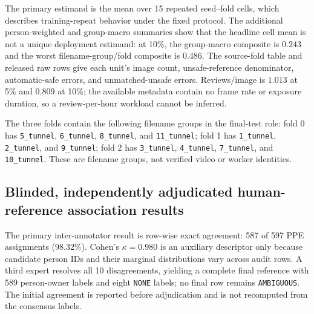 \documentclass[iicol,pdflatex,sn-mathphys-num]{sn-jnl}
\begin{document}
The primary estimand is the mean over 15 repeated seed--fold cells, which describes training-repeat behavior under the fixed protocol. The additional person-weighted and group-macro summaries show that the headline cell mean is not a unique deployment estimand: at 10\%, the group-macro composite is $0.243$ and the worst filename-group/fold composite is $0.486$. The source-fold table and released raw rows give each unit's image count, unsafe-reference denominator, automatic-safe errors, and unmatched-unsafe errors. Reviews/image is $1.013$ at 5\% and $0.809$ at 10\%; the available metadata contain no frame rate or exposure duration, so a review-per-hour workload cannot be inferred.

The three folds contain the following filename groups in the final-test role: fold 0 has \texttt{5\_tunnel}, \texttt{6\_tunnel}, \texttt{8\_tunnel}, and \texttt{11\_tunnel}; fold 1 has \texttt{1\_tunnel}, \texttt{2\_tunnel}, and \texttt{9\_tunnel}; fold 2 has \texttt{3\_tunnel}, \texttt{4\_tunnel}, \texttt{7\_tunnel}, and \texttt{10\_tunnel}. These are filename groups, not verified video or worker identities.

\subsection{Blinded, independently adjudicated human-reference association results}\label{sec:humanresults}

The primary inter-annotator result is row-wise exact agreement: 587 of 597 PPE assignments (98.32\%). Cohen's $\kappa=0.980$ is an auxiliary descriptor only because candidate person IDs and their marginal distributions vary across audit rows. A third expert resolves all 10 disagreements, yielding a complete final reference with 589 person-owner labels and eight \texttt{NONE} labels; no final row remains \texttt{AMBIGUOUS}. The initial agreement is reported before adjudication and is not recomputed from the consensus labels.
\end{document}
